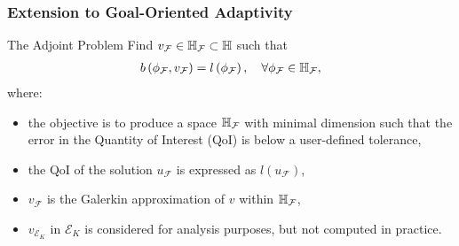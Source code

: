 \begin{frame}
\frametitle{Extension to Goal-Oriented Adaptivity}
    \begin{block}{The Adjoint Problem}
        Find \( v_{\mathcal{F}} \in \mathbb{H}_{\mathcal{F}} \subset \mathbb{H} \)  such that
  	\begin{align}
    	\label{eq:adjointH}
    	b\left(\phi_{\mathcal{F}},v_{\mathcal{F}}\right)=l\left(\phi_{\mathcal{F}}\right), \quad \forall \phi_{\mathcal{F}} \in \mathbb{H}_{\mathcal{F}},
  	\end{align}
        where:
        \begin{itemize}
            \item the objective is to produce a space $\mathbb{H}_{\mathcal{F}}$ with minimal dimension such that the error in the Quantity of Interest (QoI) is below a user-defined tolerance,
            \item the QoI of the solution $u_{\mathcal{F}}$ is expressed as $l(u_{\mathcal{F}})$,
            \item $v_{\mathcal{F}}$ is the Galerkin approximation of $v$ within $\mathbb{H}_{\mathcal{F}}$,
            \item $v_{\mathcal{E}_K}$ in $\mathcal{E}_K$ is considered for analysis purposes, but not computed in practice.
        \end{itemize}
    \end{block}     
\end{frame}

